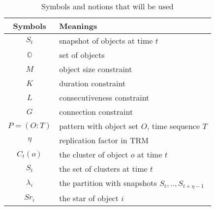 \begin{table}[h]
\centering
\begin{tabular}{|c|l|} 
\hline
Symbols & Meanings \\
\hline
$S_t$ & snapshot of objects at time $t$ \\
\hline 
$\mathbb{O}$ & set of objects \\ 
\hline
$M$ & object size constraint \\
\hline 
$K$ & duration constraint\\
\hline
$L$ & consecutiveness constraint\\
\hline
$G$ & connection constraint \\
\hline
$P=(O:T)$ & pattern with object set $O$, time sequence $T$\\
\hline
$\eta$ & replication factor in TRM\\
\hline
$C_t(o)$ & the cluster of object $o$ at time $t$ \\
\hline 
$S_t$ & the set of clusters at time $t$\\
\hline 
$\lambda_i$ & the partition with snapshots $S_t,..,S_{t+\eta-1}$ \\
\hline
$Sr_i $ &  the star of object $i$ \\
\hline 
\end{tabular} 
\caption{Symbols and notions that will be used}
\end{table}